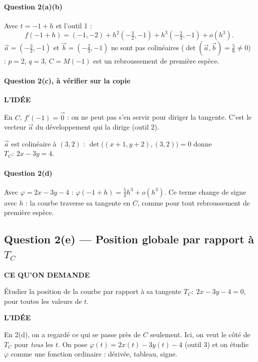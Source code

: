 \documentclass[a4paper,11pt]{article}
\numberwithin{equation}{section}
\numberwithin{figure}{section}
\numberwithin{table}{section}
\theoremstyle{enonce}
\theoremstyle{exemple}
\theoremstyle{remarque}
\newcounter{exo}[section]
\newcommand{\ve}[1]{\vec{#1}}
\newcommand{\Enonce}[1]{\begin{enoncebox}{\sffamily\bfseries\footnotesize\color{Bleu}CE QU'ON DEMANDE}\par\smallskip #1\end{enoncebox}}
\newcommand{\Idee}[1]{\begin{ideebox}{\sffamily\bfseries\footnotesize\color{Bleu}L'IDÉE}\par\smallskip #1\end{ideebox}}
\begin{document}
\paragraph{Question 2(a)(b)} Avec $t=-1+h$ et l'outil 1 :
\[f(-1+h)=(-1,-2)+h^2\left(-\tfrac32,-1\right)+h^3\left(-\tfrac23,-1\right)+o(h^3).\]
$\ve a=\left(-\frac32,-1\right)$ et $\ve b=\left(-\frac23,-1\right)$ ne sont pas colinéaires ($\det(\ve a,\ve b)=\frac56\neq0$) :
$p=2$, $q=3$, $C=M(-1)$ est un rebroussement de première espèce.

\paragraph{Question 2(c), à vérifier sur la copie}
\Idee{En $C$, $f'(-1)=\ve0$ : on ne peut pas s'en servir pour diriger la tangente. C'est le vecteur $\ve a$ du développement
qui la dirige (outil 2).}
$\ve a$ est colinéaire à $(3,2)$ : $\det\big((x+1,y+2),(3,2)\big)=0$ donne $T_C:\ 2x-3y=4$.

\paragraph{Question 2(d)} Avec $\varphi=2x-3y-4$ : $\varphi(-1+h)=\frac53h^3+o(h^3)$. Ce terme change de signe avec $h$ : la courbe
traverse sa tangente en $C$, comme pour tout rebroussement de première espèce.

\clearpage
\subsection{Question 2(e) — Position globale par rapport à \texorpdfstring{$T_C$}{TC}}\label{q:2e}

\Enonce{Étudier la position de la courbe par rapport à sa tangente $T_C:\ 2x-3y-4=0$, pour toutes les valeurs de $t$.}

\Idee{En 2(d), on a regardé ce qui se passe près de $C$ seulement. Ici, on veut le côté de $T_C$ pour \emph{tous} les $t$. On
pose $\varphi(t)=2x(t)-3y(t)-4$ (outil 3) et on étudie $\varphi$ comme une fonction ordinaire : dérivée, tableau, signe.}
\end{document}
